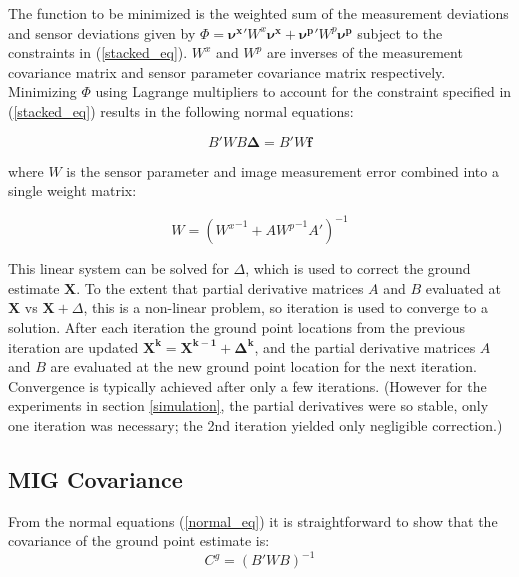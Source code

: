 \documentclass[10pt]{amsart}
\newcommand{\grnd}{\pmb{X}}
\begin{document}
The function to be minimized is the weighted sum of the measurement deviations
and sensor deviations given by 
$\Phi = \pmb{\nu^x}' W^x \pmb{\nu^x} + \pmb{\nu^p}' W^p \pmb{\nu^p}$ 
subject to the constraints in (\ref{stacked_eq}).
$W^x$ and $W^p$ are inverses of the measurement covariance matrix and sensor
parameter covariance matrix respectively. Minimizing $\Phi$ using Lagrange multipliers 
to account for the constraint specified in (\ref{stacked_eq}) results in the following normal equations:

\begin{equation} \label{normal_eq}
B' W B\pmb{\Delta} = B' W \pmb{f}
\end{equation}

where $W$ is the sensor parameter and image measurement error combined into a single weight matrix:

\begin{equation}\label{weight_eq}
W = ({W^x}^{-1} + A {W^p}^{-1} {A}')^{-1}
\end{equation}

This linear system can be solved for $\Delta$, which is used to correct the
ground estimate $\grnd$. To the extent that partial derivative matrices $A$
and $B$ evaluated at $\grnd$ vs $\grnd+\Delta$, this is a non-linear
problem, so iteration is used to converge to a solution.  After each iteration
the ground point locations from the previous iteration are updated $\pmb{X^k} =
\pmb{X^{k - 1}} + \pmb{\Delta^k}$, and the partial derivative matrices $A$ and
$B$ are evaluated at the new ground point location for the next iteration.
Convergence is typically achieved after only a few iterations. (However for the
experiments in section \ref{simulation}, the partial derivatives were so stable,
only one iteration was necessary; the 2nd iteration yielded only negligible
correction.)

\subsection{MIG Covariance}
From the normal equations (\ref{normal_eq}) it is straightforward to show that
the covariance of the ground point estimate is:
\begin{equation} \label{covariance_eq}
C^g = (B'WB)^{-1}
\end{equation}
\end{document}
